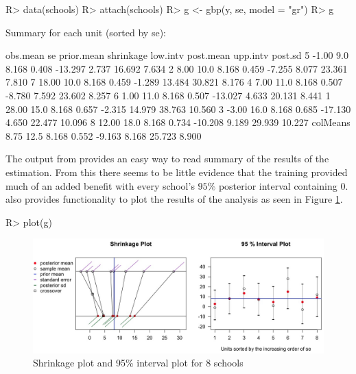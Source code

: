 \documentclass[article]{jss}
\begin{document}
\begin{CodeChunk}
\begin{CodeInput}
R> data(schools)
R> attach(schools)
R> g <- gbp(y, se, model = "gr")
R> g
\end{CodeInput}
\begin{CodeOutput}
Summary for each unit (sorted by se):

         obs.mean   se prior.mean shrinkage low.intv post.mean upp.intv post.sd
5           -1.00  9.0      8.168     0.408  -13.297     2.737   16.692   7.634
2            8.00 10.0      8.168     0.459   -7.255     8.077   23.361   7.810
7           18.00 10.0      8.168     0.459   -1.289    13.484   30.821   8.176
4            7.00 11.0      8.168     0.507   -8.780     7.592   23.602   8.257
6            1.00 11.0      8.168     0.507  -13.027     4.633   20.131   8.441
1           28.00 15.0      8.168     0.657   -2.315    14.979   38.763  10.560
3           -3.00 16.0      8.168     0.685  -17.130     4.650   22.477  10.096
8           12.00 18.0      8.168     0.734  -10.208     9.189   29.939  10.227
colMeans     8.75 12.5      8.168     0.552   -9.163     8.168   25.723   8.900
\end{CodeOutput}
\end{CodeChunk}
The output from  provides an easy way to read summary of the results of the estimation. From this there seems to be little evidence that the training provided much of an added benefit with every school's $95\%$ posterior interval containing 0.  also provides functionality to plot the results of the analysis as seen in Figure \ref{fig:8schoolsplot}.

\begin{CodeChunk}
\begin{CodeInput}
R> plot(g)
\end{CodeInput}
\end{CodeChunk}

\begin{figure}[h] 
\begin{center}
\includegraphics[scale=0.3]{school1.png}
\caption{Shrinkage plot and 95\% interval plot for 8 schools}
\label{fig:8schoolsplot}
\end{center}
\end{figure}
\end{document}
